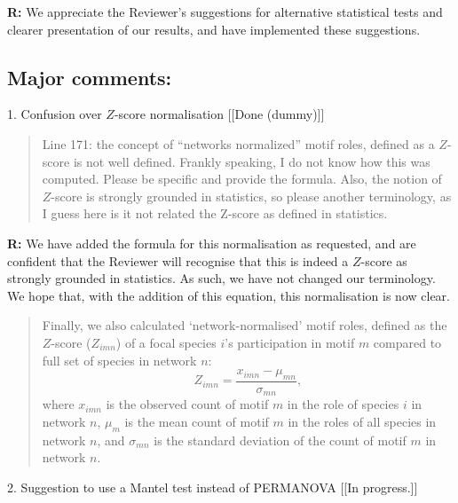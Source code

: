 \documentclass[12pt]{article}
\begin{document}
  \textbf{R:} We appreciate the Reviewer's suggestions for alternative statistical tests and clearer presentation of our results, and have implemented these suggestions.

  \smallskip

  \subsection*{Major comments:}

    1. Confusion over $Z$-score normalisation [[Done (dummy)]]

      \begin{quotation}
        Line 171: the concept of “networks normalized” motif roles, defined as a $Z$-score is not well defined. Frankly speaking, I do not know how this was computed. Please be specific and provide the formula. Also, the notion of $Z$-score is strongly grounded in statistics, so please another terminology, as I guess here is it not related the Z-score as defined in statistics.
      \end{quotation}

      \smallskip

      \textbf{R:} We have added the formula for this normalisation as requested, and are confident that the Reviewer will recognise that this is indeed a $Z$-score as strongly grounded in statistics. As such, we have not changed our terminology. We hope that, with the addition of this equation, this normalisation is now clear.

      \begin{quotation}
        Finally, we also calculated `network-normalised' motif roles, defined as the $Z$-score ($Z_{imn}$) of a focal species $i$'s participation in motif $m$ compared to full set of species in network $n$:
        \begin{equation}
                Z_{imn} = \frac{x_{imn}-\mu_{mn}}{\sigma_{mn}} ,
        \end{equation}
        where $x_{imn}$ is the observed count of motif $m$ in the role of species $i$ in network $n$, $\mu_m$ is the mean count of motif $m$ in the roles of all species in network $n$, and $\sigma_{mn}$ is the standard deviation of the count of motif $m$ in network $n$.
      \end{quotation}

    \smallskip

    2. Suggestion to use a Mantel test instead of PERMANOVA [[In progress.]]
\end{document}
